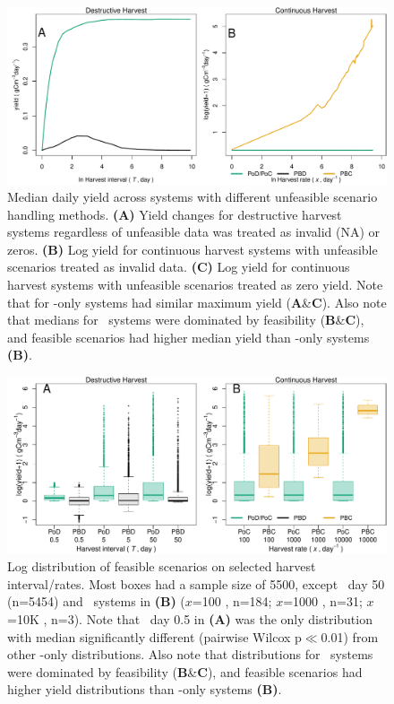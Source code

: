 \documentclass[../thesis.tex]{subfiles} %
\begin{document}
\begin{figure}[H]
    \centering
    \includegraphics[width=\linewidth]{result/DailyYield.pdf}
    \caption[Median daily yield across systems]{Median daily yield across systems with different unfeasible scenario handling methods.  \textbf{(A)} Yield changes for destructive harvest systems regardless of unfeasible data was treated as invalid (NA) or zeros.  \textbf{(B)} Log yield for continuous harvest systems with unfeasible scenarios treated as invalid data.  \textbf{(C)} Log yield for continuous harvest systems with unfeasible scenarios treated as zero yield.  Note that for \phy-only systems had similar maximum yield (\textbf{A}\&\textbf{C}).  Also note that medians for \PBH\ systems were dominated by feasibility  (\textbf{B}\&\textbf{C}), and feasible scenarios had higher median yield than \phy-only systems \textbf{(B)}.}
    \label{f:ydDaily}
\end{figure}

\begin{figure}[H]
    \centering
    \includegraphics[width=\linewidth]{result/Harvest.pdf}
    \caption[Yield flux distribution by harvest mode]{Log distribution of feasible scenarios on selected harvest interval/rates.  Most boxes had a sample size of 5500, except \PBN\ day 50 (n=5454) and \PBH\ systems in \textbf{(B)} ($x$=100 \dayU, n=184; $x$=1000 \dayU, n=31; $x$=10K \dayU, n=3).  Note that \PoN\ day 0.5 in \textbf{(A)} was the only distribution with median significantly different (pairwise Wilcox p$\ll$0.01) from other \phy-only distributions.  Also note that distributions for \PBH\ systems were dominated by feasibility (\textbf{B}\&\textbf{C}), and feasible scenarios had higher yield distributions than \phy-only systems \textbf{(B)}.}
    \label{f:ydByHarv}
\end{figure}
\end{document}
